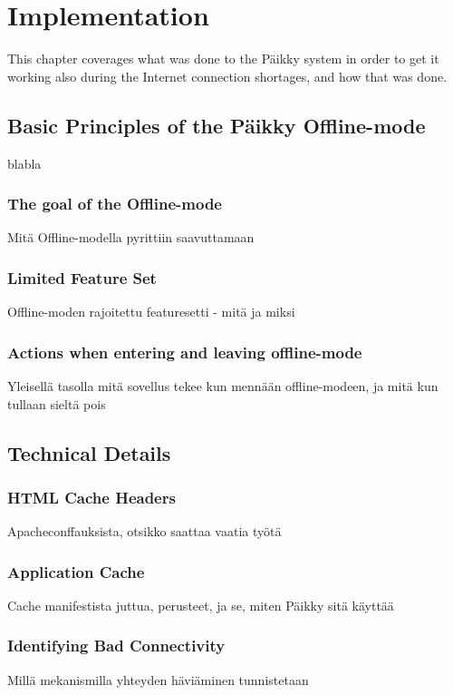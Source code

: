 
\chapter{Implementation}
This chapter coverages what was done to the Päikky system in order to get it working also during the Internet connection shortages, and how that was done. 


\section{Basic Principles of the Päikky Offline-mode}
blabla

\subsection{The goal of the Offline-mode}
Mitä Offline-modella pyrittiin saavuttamaan

\subsection{Limited Feature Set}
Offline-moden rajoitettu featuresetti - mitä ja miksi

\subsection{Actions when entering and leaving offline-mode}
Yleisellä tasolla mitä sovellus tekee kun mennään offline-modeen, ja mitä kun tullaan sieltä pois

\section{Technical Details}

\subsection{HTML Cache Headers}
Apacheconffauksista, otsikko saattaa vaatia työtä


\subsection{Application Cache}
Cache manifestista juttua, perusteet, ja se, miten Päikky sitä käyttää

\subsection{Identifying Bad Connectivity}
Millä mekanismilla yhteyden häviäminen tunnistetaan


